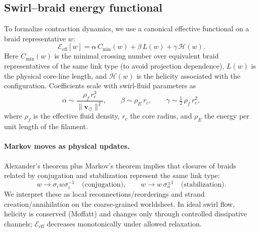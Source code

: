 \documentclass[10pt,reprint,aps,onecolumn,nofootinbib]{revtex4-2}
\begin{document}
    \subsection*{Swirl–braid energy functional}
        To formalize contraction dynamics, we use a canonical effective functional on a braid representative \(w\):
        \begin{equation}\label{eq:Eeff-braid}
            \mathcal{E}_{\mathrm{eff}}[w] = \alpha\,C_{\min}(w) + \beta\,L(w) + \gamma\,\mathcal{H}(w).
        \end{equation}
        Here \(C_{\min}(w)\) is the minimal crossing number over equivalent braid representatives of the same link type (to avoid projection dependence), \(L(w)\) is the physical core-line length, and \(\mathcal{H}(w)\) is the helicity associated with the configuration. Coefficients scale with swirl-fluid parameters as
        \[
            \alpha \sim \frac{\rho_f\, r_c^3}{\|\mathbf{v}_{\!\boldsymbol{\circlearrowleft}}\|^{2}},\qquad
            \beta \sim \rho_E\, r_c,\qquad
            \gamma \sim \tfrac12\,\rho_f\, r_c^2,
        \]
        where \(\rho_f\) is the effective fluid density, \(r_c\) the core radius, and \(\rho_E\) the energy per unit length of the filament.

    \paragraph*{Markov moves as physical updates.}
        Alexander’s theorem plus Markov’s theorem implies that closures of braids related by conjugation and stabilization represent the same link type:
        \[
            w \to \sigma_i w \sigma_i^{-1}\quad\text{(conjugation)},\qquad
            w \to w\,\sigma_{n}^{\pm 1}\quad\text{(stabilization)}.
        \]
        We interpret these as local reconnections/reorderings and strand creation/annihilation on the coarse-grained worldsheet. In ideal swirl flow, helicity is conserved (Moffatt) and changes only through controlled dissipative channels; \(\mathcal{E}_{\mathrm{eff}}\) decreases monotonically under allowed relaxation.
\end{document}
